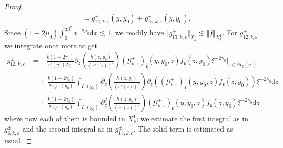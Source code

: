 \documentclass[11pt,reqno]{amsproc}
\theoremstyle{definition}
\numberwithin{equation}{section}
\newcommand{\G}{{\mathcal{G}}}
\newcommand{\s}{{\mathsf{s}}}
\renewcommand{\d}{\mathrm{d}}
\newcommand{\ep}{\varepsilon}
\begin{document}
\begin{proof}
\begin{align*}
&= g_{12,k,\ep}^\pm(y,y_0) + g_{13,k,\ep}^\pm(y,y_0).
\end{align*}
Since $(1-2\mu_0)\int_0^{3\beta^2}x^{-2\mu_0}\d x \lesssim 1$, we readily have $\Vert g_{13,k,\ep}^\pm\Vert_{X_k^1}\lesssim \Vert f \Vert_{X_k^1}$. For $g_{12,k,\ep}^\pm$, we integrate once more to get
\begin{align*}
g_{12,k,\ep}^\pm &= -\frac{k(1-2\gamma_0)}{v'(y_0)2\gamma_0} \partial_z \left( \frac{h(z,y_0)}{(v'(z))^2} \right)  \left( \G_{k,\ep}^\pm \right)_\s(y,y_0,z) f_\s(z,y_0) \xi^{-2\gamma_0} \Big|_{z\in \partial I_3(y_0)} \\
&\quad + \frac{k(1-2\gamma_0)}{2\gamma_0 v'(y_0)}\int_{I_3(y_0)} \partial_z \left( \frac{h(z,y_0)}{(v'(z))^2} \right) \partial_z \left( \left( \G_{k,\ep}^\pm \right)_\s(y,y_0,z) f_\s(z,y_0) \right) \xi^{-2\gamma_0} \d z \\
&\quad + \frac{k(1-2\gamma_0)}{2\gamma_0 v'(y_0)}\int_{I_3(y_0)} \partial_z^2 \left( \frac{h(z,y_0)}{(v'(z))^2} \right)  \left( \G_{k,\ep}^\pm \right)_\s(y,y_0,z) f_\s(z,y_0)  \xi^{-2\gamma_0} \d z 
\end{align*}
where now each of them is bounded in $X_k^1$; we estimate the first integral as in $g_{6,k,\ep}^\pm$ and the second integral as in $g_{13,k,\ep}^\pm$. The solid term is estimated as usual.


\end{proof}
\end{document}

